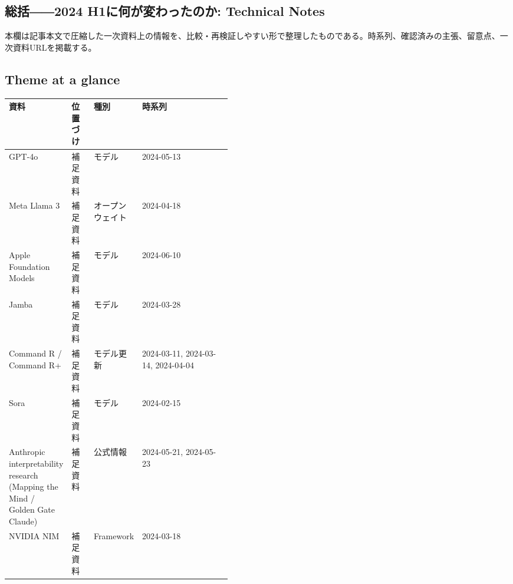 \subsection*{総括――2024 H1に何が変わったのか: Technical Notes}
本欄は記事本文で圧縮した一次資料上の情報を、比較・再検証しやすい形で整理したものである。時系列、確認済みの主張、留意点、一次資料URLを掲載する。
\smallskip
{}\par
\medskip
\subsection*{Theme at a glance}
\begin{center}
\footnotesize
\begin{tabularx}{\linewidth}{@{}p{0.20\linewidth}p{0.10\linewidth}p{0.14\linewidth}X@{}}
\toprule
資料 & 位置づけ & 種別 & 時系列 \\
\midrule
GPT-4o & 補足資料 & モデル & 2024-05-13     \\
Meta Llama 3 & 補足資料 & オープンウェイト & 2024-04-18     \\
Apple Foundation Models & 補足資料 & モデル & 2024-06-10     \\
Jamba & 補足資料 & モデル & 2024-03-28     \\
Command R / Command R+ & 補足資料 & モデル更新 & 2024-03-11, 2024-03-14, 2024-04-04     \\
Sora & 補足資料 & モデル & 2024-02-15     \\
Anthropic interpretability research (Mapping the Mind / Golden Gate Claude) & 補足資料 & 公式情報 & 2024-05-21, 2024-05-23     \\
NVIDIA NIM & 補足資料 & Framework & 2024-03-18     \\
\bottomrule
\end{tabularx}
\end{center}
\normalsize


